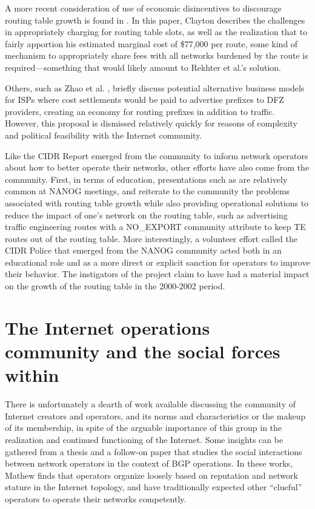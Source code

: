 A more recent consideration of use of economic disincentives to discourage routing table growth is found in \cite{Clayton:2010bh}. In this paper, Clayton describes the challenges in appropriately charging for routing table slots, as well as the realization that to fairly apportion his estimated marginal cost of \$77,000 per route, some kind of mechanism to appropriately share fees with all networks burdened by the route is required---something that would likely amount to Rekhter et al.'s solution. 

Others, such as Zhao et al. \cite{Zhao:2001ly}, briefly discuss potential alternative business models for ISPs where cost settlements would be paid to advertise prefixes to DFZ providers, creating an economy for routing prefixes in addition to traffic. However, this proposal is dismissed relatively quickly for reasons of complexity and political feasibility with the Internet community.

Like the CIDR Report emerged from the community to inform network operators about how to better operate their networks, other efforts have also come from the community. First, in terms of education, presentations such as \cite{Steenbergen:2010nx} are relatively common at NANOG meetings, and reiterate to the community the problems associated with routing table growth while also providing operational solutions to reduce the impact of one's network on the routing table, such as advertising traffic engineering routes with a NO\_EXPORT community attribute to keep TE routes out of the routing table.  More interestingly, a volunteer effort called the CIDR Police \cite{Nussbacher:2003ys} that emerged from the NANOG community acted both in an educational role and as a more direct or explicit sanction for operators to improve their behavior. The instigators of the project claim to have had a material impact on the growth of the routing table in the 2000-2002 period.

\section{The Internet operations community and the social forces within}

There is unfortunately a dearth of work available discussing the community of Internet creators and operators, and its norms and characteristics or the makeup of its membership, in spite of the arguable importance of this group in the realization and continued functioning of the Internet. Some insights can be gathered from a thesis \cite{Mathew:2009dz} and a follow-on paper \cite{Mathew:2010ly} that studies the social interactions between network operators in the context of BGP operations. In these works, Mathew finds that operators organize loosely based on reputation and network stature in the Internet topology, and have traditionally expected other ``clueful'' operators to operate their networks competently.

